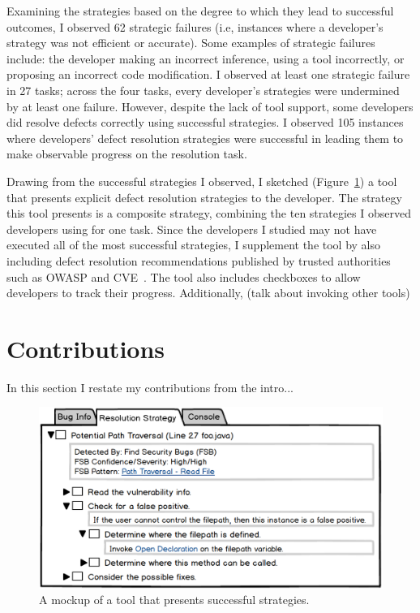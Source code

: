 \documentclass{sig-alternate}
\begin{document}
Examining the strategies based on the degree to which they lead to successful outcomes, I observed 62 strategic failures (i.e, instances where a developer's strategy was not efficient or accurate). Some examples of strategic failures include: the developer making an incorrect inference, using a tool incorrectly, or proposing an incorrect code modification.
I observed at least one strategic failure in 27 tasks; across the four tasks, every developer's strategies were undermined by at least one failure.
However, despite the lack of tool support, some developers did resolve defects correctly using successful strategies. I observed 105 instances where developers' defect resolution strategies were successful in leading them to make observable progress on the resolution task.

Drawing from the successful strategies I observed, I sketched (Figure~\ref{fig:tool}) a tool that presents explicit defect resolution strategies to the developer. 
The strategy this tool presents is a composite strategy, combining the ten strategies I observed developers using for one task.
Since the developers I studied may not have executed all of the most successful strategies, I supplement the tool by also including defect resolution recommendations published by trusted authorities such as OWASP and CVE~\cite{OWASP, CVE}.
The tool also includes checkboxes to allow developers to track their progress.
Additionally, (talk about invoking other tools)

\section{Contributions}


In this section I restate my contributions from the intro...



\begin{figure}
	\centering
	\includegraphics[width=\columnwidth]{images/toolscreenshot}
	\caption{A mockup of a tool that presents successful strategies.}
	\label{fig:tool} 
\end{figure}





%


\end{document}
